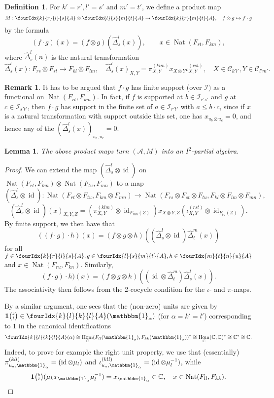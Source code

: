 \documentclass[10pt]{article}
\DeclareMathOperator{\id}{id}
\DeclareMathOperator{\Hom}{Hom}
\DeclareMathOperator{\Nat}{\mathrm{Nat}}
\newcommand{\C}{\mathbb{C}}
\newcommand{\CatC}{\mathcal{C}}
\newcommand{\Grt}[3]{#1{\tiny{\begin{pmatrix} #2\\#3\end{pmatrix}}}}
\newcommand{\Unitb}{\mathbbm{1}}
\newcommand{\UnitC}[2]{\Grt{\mathbf{1}}{#1}{#2}}
\newcommand{\Gr}[5]{\fourIdx{#2}{#4}{#3}{#5}{#1}}%
\newtheorem{Lem}[Theorem]{Lemma}
\theoremstyle{definition}
\newtheorem{Def}[Theorem]{Definition}
\newtheorem{Rem}[Theorem]{Remark}
\numberwithin{equation}{section}
\begin{document}
\begin{Def} For $k'=r', l'=s'$ and $m'=t'$, we define a product map \[M:\Gr{A}{k}{l}{r}{s} \otimes \Gr{A}{l}{m}{s}{t}\rightarrow  \Gr{A}{k}{m}{r}{t},\quad f\otimes g \mapsto f\cdot g\] by the formula \[(f\cdot g)(x) = (f\otimes g)( \hat{\Delta}^{l}_{s}(x)), \qquad  x \in \Nat(F_{rt},F_{km}),\] where $\hat{\Delta}^l_s(n)$ is the natural transformation\[\hat{\Delta}^l_s(x):  F_{rs}\otimes F_{st}\rightarrow F_{kl}\otimes F_{lm},\quad \hat{\Delta}^l_s(x)_{X,Y} = \pi^{(klm)}_{X,Y}x_{X\otimes Y} \iota^{(rst)}_{X,Y},\quad X\in \CatC_{k'l'},Y\in \CatC_{l'm'}.\]
\end{Def}

\begin{Rem} It has to be argued that $f\cdot g$ has finite support (over $\mathcal{I})$ as a functional on $\Nat(F_{rt},F_{km})$. In fact, if $f$ is supported at $b\in \mathcal{I}_{r's'}$ and $g$ at $c\in \mathcal{I}_{s't'}$, then $f\cdot g$ has support in the finite set of $a\in \mathcal{I}_{r't'}$ with $a\leq b\cdot c$, since if $x$ is a natural transformation with support outside this set, one has $x_{u_b\otimes u_c}=0$, and hence any of the $\left(\hat{\Delta}^l_s(x)\right)_{u_b,u_c} =0$.
\end{Rem}

\begin{Lem} The above product maps turn $(\mathscr{A},M)$ into an $I^2$-partial algebra.
\end{Lem}
\begin{proof} We can extend the map $(\hat{\Delta}^l_s\otimes \id)$ on $\Nat(F_{rt},F_{km})\otimes \Nat(F_{tu},F_{mn})$ to a map \[(\hat{\Delta}^l_s\otimes \id): \Nat(F_{rt}\otimes F_{tu},F_{km}\otimes F_{mn}) \rightarrow  \Nat(F_{rs}\otimes F_{st}\otimes F_{tu},F_{kl}\otimes F_{lm}\otimes F_{mn}),\] \[(\hat{\Delta}^l_s\otimes \id)(x)_{X,Y,Z} = \left(\pi^{(klm)}_{X,Y}\otimes \id_{F_{mn}(Z)}\right) x_{X\otimes Y, Z} \left(\iota^{(rst)}_{X,Y} \otimes \id_{F_{tu}(Z)}\right).\]
By finite support, we then have that \[((f\cdot g)\cdot h)(x) = (f\otimes g\otimes h)((\hat{\Delta}^l_s\otimes \id)\hat{\Delta}^m_t(x))\] for all $f\in \Gr{A}{k}{l}{r}{s},g\in \Gr{A}{l}{m}{s}{t},h\in \Gr{A}{m}{n}{t}{u}$ and $x\in  \Nat(F_{ru},F_{kn})$. Similarly, \[(f\cdot g)\cdot h)(x) = (f\otimes g\otimes h)((\id\otimes \hat{\Delta}^m_t)\hat{\Delta}^l_s(x)).\] The associativity then follows from the 2-cocycle condition for the $\iota$- and $\pi$-maps. 

By a similar argument, one sees that the (non-zero) units are given by $\UnitC{k}{l}\in \Gr{A}{k}{k}{l}{l}(\Unitb_{\alpha})$  (for $\alpha=k'=l'$) corresponding to $1$ in the canonical identifications  \[\Gr{A}{k}{k}{l}{l}(\alpha) \cong \Hom_{\C}(F_{ll}(\Unitb_{\alpha}),F_{kk}(\Unitb_{\alpha}))^*\cong \Hom_{\C}(\C,\C)^*  \cong \C^* \cong \C.\] Indeed, to prove for example the right unit property, we use that (essentially) $\pi_{u_a,\Unitb_{\alpha}}^{(kll)} =(\id\otimes \mu_l)$ and $\iota_{u_a,\Unitb_{\alpha}}^{(kll)} = (\id\otimes \mu_l^{-1})$, while \[\UnitC{k}{l}(\mu_kx_{\Unitb_{\alpha}}\mu_l^{-1}) = x_{\Unitb_{\alpha}} \in \C,\quad x\in \Nat(F_{ll},F_{kk}).\] %
\end{proof} 
\end{document}
